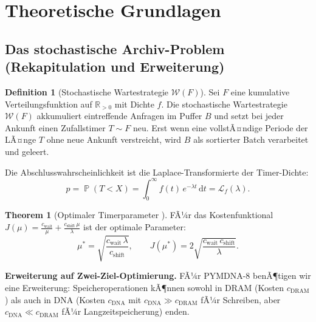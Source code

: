 ﻿\documentclass[a4paper,12pt]{article}
\theoremstyle{definition}
\newtheorem{definition}{Definition}[section]
\newtheorem{theorem}{Theorem}[section]
\DeclareMathOperator{\Prob}{\mathbb{P}}
\begin{document}
\section{Theoretische Grundlagen}

\subsection{Das stochastische Archiv-Problem (Rekapitulation und Erweiterung)}

\begin{definition}[Stochastische Wartestrategie $\mathcal{W}(F)$]
  \label{def:waitstrat}
  Sei $F$ eine kumulative Verteilungsfunktion auf $\mathbb{R}_{>0}$ mit Dichte $f$.
  Die stochastische Wartestrategie $\mathcal{W}(F)$ akkumuliert eintreffende
  Anfragen im Puffer $B$ und setzt bei jeder Ankunft einen Zufallstimer $T \sim F$
  neu. Erst wenn eine vollstÃ¤ndige Periode der LÃ¤nge $T$ ohne neue Ankunft
  verstreicht, wird $B$ als sortierter Batch verarbeitet und geleert.
\end{definition}

Die Abschlusswahrscheinlichkeit ist die Laplace-Transformierte der Timer-Dichte:
\begin{equation}
  p = \Prob(T < X) = \int_0^\infty f(t)\,e^{-\lambda t}\,\mathrm{d}t
  = \mathcal{L}_f(\lambda).
  \label{eq:abschluss}
\end{equation}

\begin{theorem}[Optimaler Timerparameter \cite{epp2026pymca8}]
  \label{thm:optmu}
  FÃ¼r das Kostenfunktional
  $J(\mu) = \frac{c_{\mathrm{wait}}}{\mu} + \frac{c_{\mathrm{shift}}\,\mu}{\lambda}$
  ist der optimale Parameter:
  \begin{equation}
    \mu^* = \sqrt{\frac{c_{\mathrm{wait}}\,\lambda}{c_{\mathrm{shift}}}},
    \qquad J(\mu^*) = 2\sqrt{\frac{c_{\mathrm{wait}}\,c_{\mathrm{shift}}}{\lambda}}.
    \label{eq:muopt}
  \end{equation}
\end{theorem}

\textbf{Erweiterung auf Zwei-Ziel-Optimierung.}
FÃ¼r PYMDNA-8 benÃ¶tigen wir eine Erweiterung: Speicheroperationen kÃ¶nnen
sowohl in DRAM (Kosten $c_{\mathrm{DRAM}}$) als auch in DNA (Kosten $c_{\mathrm{DNA}}$
mit $c_{\mathrm{DNA}} \gg c_{\mathrm{DRAM}}$ fÃ¼r Schreiben, aber $c_{\mathrm{DNA}} \ll c_{\mathrm{DRAM}}$
fÃ¼r Langzeitspeicherung) enden.
\end{document}
